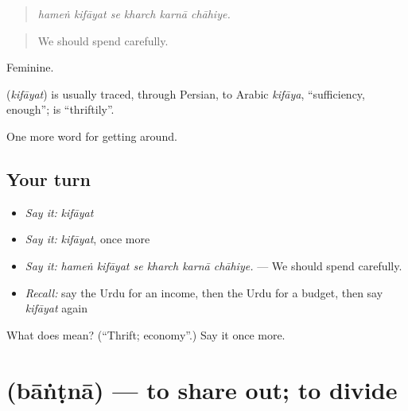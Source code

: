 \begin{quote}
     
\end{quote}

\begin{quote}
\emph{hameṅ kifāyat se kharch karnā chāhiye.}
\end{quote}

\begin{quote}
We should spend carefully.
\end{quote}

Feminine.

\begin{cousinweb}
\textbf{} (\emph{kifāyat}) is usually traced, through Persian, to Arabic \emph{kifāya}, \textquotedblleft{}sufficiency, enough\textquotedblright{}; \textbf{ } is \textquotedblleft{}thriftily\textquotedblright{}.
\end{cousinweb}

\begin{grammarlens}[title={What you've built}]
One more word for getting around.
\end{grammarlens}

\subsection*{Your turn}
\begin{itemize}
\raggedright
  \item \emph{Say it:} \emph{kifāyat}
  \item \emph{Say it:} \emph{kifāyat}, once more
  \item \emph{Say it:} \emph{hameṅ kifāyat se kharch karnā chāhiye.} — We should spend carefully.
  \item \emph{Recall:} say the Urdu for an income, then the Urdu for a budget, then say \emph{kifāyat} again
\end{itemize}

\begin{tcolorbox}[breakable,colback=teal!4,colframe=teal!35!black,title={Before you move on}]
What does  mean? (\textquotedblleft{}Thrift; economy\textquotedblright{}.) Say it once more.
\end{tcolorbox}
\section[\texorpdfstring{\ur{بانٹنا} (bāṅṭnā)}{بانٹنا (bāṅṭnā)}]{ (bāṅṭnā) — to share out; to divide}

